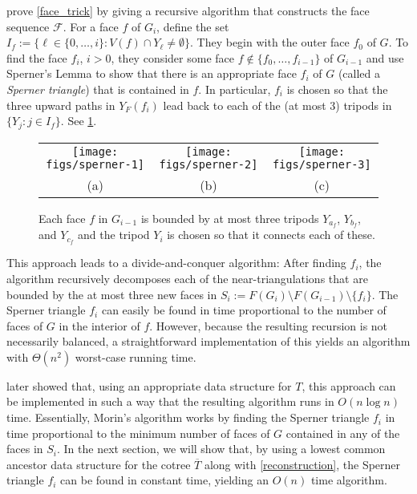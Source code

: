 \documentclass{patmorin}
\begin{document}
\citet{dujmovic.joret.ea:planar} prove \cref{face_trick} by giving a recursive algorithm that constructs the face sequence $\mathcal{F}$.  For a face $f$ of $G_i$, define the set $I_f:=\{\ell\in\{0,\ldots,i\}:V(f)\cap Y_\ell\neq\emptyset\}$.  They begin with the outer face $f_0$ of $G$.  To find the face $f_i$, $i>0$, they consider some face $f\not\in\{f_0,\ldots,f_{i-1}\}$ of $G_{i-1}$ and use Sperner's Lemma to show that there is an appropriate face $f_i$ of $G$ (called a \emph{Sperner triangle}) that is contained in $f$. In particular, $f_i$ is chosen so that the three upward paths in $Y_F(f_i)$ lead back to each of the (at most 3) tripods in $\{Y_j:j\in I_f\}$. See \cref{sperner}.

\begin{figure}
  \begin{center}
    \begin{tabular}{ccc}
      \texttt{[image: figs/sperner-1]} &
      \texttt{[image: figs/sperner-2]} &
      \texttt{[image: figs/sperner-3]} \\
      (a) & (b) & (c)
    \end{tabular}
  \end{center}
  \caption{Each face $f$ in $G_{i-1}$ is bounded by at most three tripods $Y_{a_f}$, $Y_{b_f}$, and $Y_{c_f}$ and the tripod $Y_i$ is chosen so that it connects each of these.}
  \label{sperner}
\end{figure}

This approach leads to a divide-and-conquer algorithm: After finding $f_i$, the algorithm recursively decomposes each of the near-triangulations that are bounded by the at most three new faces in $S_i:=F(G_i)\setminus F(G_{i-1})\setminus \{f_i\}$.  The Sperner triangle $f_i$ can easily be found in time proportional to the number of faces of $G$ in the interior of $f$.  However, because the resulting recursion is not necessarily balanced, a straightforward implementation of this yields an algorithm with $\Theta(n^2)$ worst-case running time.

\citet{morin:fast} later showed that, using an appropriate data structure for $T$, this approach can be implemented in such a way that the resulting algorithm runs in $O(n\log n)$ time.  Essentially, Morin's algorithm works by finding the Sperner triangle $f_i$ in time proportional to the minimum number of faces of $G$ contained in any of the faces in $S_i$.  In the next section, we will show that, by using a lowest common ancestor data structure for the cotree $\overline{T}$ along with \cref{reconstruction}, the Sperner triangle $f_i$ can be found in constant time, yielding an $O(n)$ time algorithm.
\end{document}
